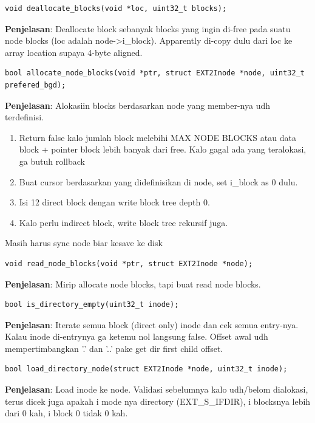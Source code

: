 \begin{lstlisting}
void deallocate_blocks(void *loc, uint32_t blocks);
\end{lstlisting}

\textbf{Penjelasan}: Deallocate block sebanyak blocks yang ingin di-free pada suatu node blocks (loc adalah node->i\_block). Apparently di-copy dulu dari loc ke array location supaya 4-byte aligned.

\begin{lstlisting}
bool allocate_node_blocks(void *ptr, struct EXT2Inode *node, uint32_t prefered_bgd);
\end{lstlisting}

\textbf{Penjelasan}: Alokasiin blocks berdasarkan node yang member-nya udh terdefinisi.
\begin{enumerate}
    \item Return false kalo jumlah block melebihi MAX NODE BLOCKS atau data block + pointer block lebih banyak dari free. Kalo gagal ada yang teralokasi, ga butuh rollback
    \item Buat cursor berdasarkan yang didefinisikan di node, set i\_block as 0 dulu.
    \item Isi 12 direct block dengan write block tree depth 0.
    \item Kalo perlu indirect block, write block tree rekursif juga.
\end{enumerate}
Masih harus sync node biar kesave ke disk

\begin{lstlisting}
void read_node_blocks(void *ptr, struct EXT2Inode *node);
\end{lstlisting}

\textbf{Penjelasan}: Mirip allocate node blocks, tapi buat read node blocks.

\begin{lstlisting}
bool is_directory_empty(uint32_t inode);
\end{lstlisting}

\textbf{Penjelasan}: Iterate semua block (direct only) inode dan cek semua entry-nya. Kalau inode di-entrynya ga ketemu nol langsung false. Offset awal udh mempertimbangkan '.' dan '..' pake get dir first child offset.

\begin{lstlisting}
bool load_directory_node(struct EXT2Inode *node, uint32_t inode);
\end{lstlisting}

\textbf{Penjelasan}: Load inode ke node. Validasi sebelumnya kalo udh/belom dialokasi, terus dicek juga apakah i mode nya directory (EXT\_S\_IFDIR), i blocksnya lebih dari 0 kah, i block 0 tidak 0 kah.

